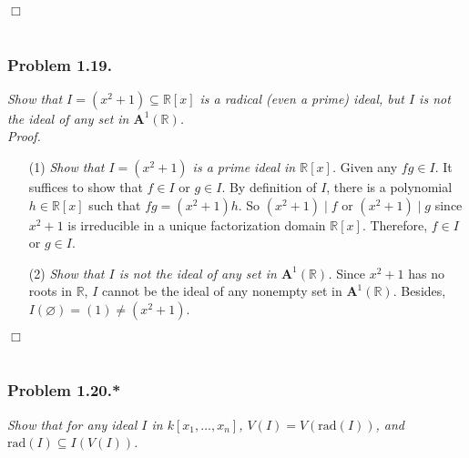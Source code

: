 \documentclass{article}
\begin{document}
$\Box$ \\\\






\subsubsection*{Problem 1.19.}
\emph{Show that $I = (x^2+1) \subseteq \mathbb{R}[x]$ is a radical (even a prime) ideal,
but $I$ is not the ideal of any set in $\mathbf{A}^1(\mathbb{R})$.} \\

\emph{Proof.}
\begin{enumerate}
\item[(1)]
  \emph{Show that $I = (x^2+1)$ is a prime ideal in $\mathbb{R}[x]$.}
  Given any $fg \in I$.
  It suffices to show that $f \in I$ or $g \in I$.
  By definition of $I$,
  there is a polynomial $h \in \mathbb{R}[x]$ such that $fg = (x^2+1)h$.
  So $(x^2+1) \mid f$ or $(x^2+1) \mid g$
  since $x^2+1$ is irreducible in a unique factorization domain $\mathbb{R}[x]$.
  Therefore, $f \in I$ or $g \in I$.

\item[(2)]
  \emph{Show that $I$ is not the ideal of any set in $\mathbf{A}^1(\mathbb{R})$.}
  Since $x^2+1$ has no roots in $\mathbb{R}$,
  $I$ cannot be the ideal of any nonempty set in $\mathbf{A}^1(\mathbb{R})$.
  Besides,
  $I(\varnothing) = (1) \neq (x^2+1)$.
\end{enumerate}
$\Box$ \\\\






\subsubsection*{Problem 1.20.*}
\emph{Show that for any ideal $I$ in $k[x_1,\ldots,x_n]$,
$V(I) = V(\mathrm{rad}(I))$, and $\mathrm{rad}(I) \subseteq I(V(I))$.} \\
\end{document}
